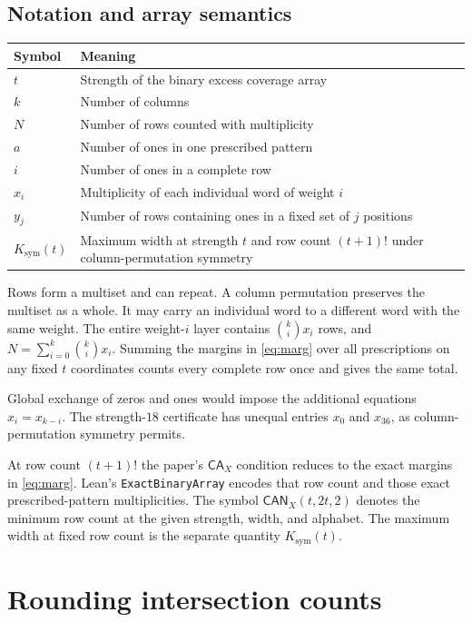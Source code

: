 \documentclass[11pt]{article}
\newcommand{\cx}{\mathsf{CA}_{X}}
\newcommand{\Ksym}{K_{\mathrm{sym}}}
\newcommand{\code}[1]{\texttt{#1}}
\begin{document}
\subsection{Notation and array semantics}
\begin{center}
\begin{tabular}{@{}lp{.79\linewidth}@{}}
\toprule
Symbol & Meaning \\
\midrule
\(t\) & Strength of the binary excess coverage array \\
\(k\) & Number of columns \\
\(N\) & Number of rows counted with multiplicity \\
\(a\) & Number of ones in one prescribed pattern \\
\(i\) & Number of ones in a complete row \\
\(x_i\) & Multiplicity of each individual word of weight \(i\) \\
\(y_j\) & Number of rows containing ones in a fixed set of \(j\) positions \\
\(\Ksym(t)\) & Maximum width at strength \(t\) and row count \((t+1)!\)
               under column-permutation symmetry \\
\bottomrule
\end{tabular}
\end{center}

Rows form a multiset and can repeat. A column permutation preserves
the multiset as a whole. It may carry an individual word to a
different word with the same weight. The entire weight-\(i\) layer
contains \(\binom{k}{i}x_i\) rows, and
\(N=\sum_{i=0}^{k}\binom{k}{i}x_i\). Summing the margins in
\eqref{eq:marg} over all prescriptions on any fixed \(t\)
coordinates counts every complete row once and gives the same total.

Global exchange of zeros and ones would impose the additional equations
\(x_i=x_{k-i}\). The strength-\(18\) certificate has unequal entries
\(x_0\) and \(x_{36}\), as column-permutation symmetry permits.

At row count \((t+1)!\) the paper's \(\cx\) condition reduces to
the exact margins in \eqref{eq:marg}. Lean's \code{ExactBinaryArray}
encodes that row count and those exact prescribed-pattern
multiplicities. The symbol \(\mathsf{CAN}_X(t,2t,2)\) denotes the
minimum row count at the given strength, width, and alphabet.
The maximum width at fixed row count is the separate quantity \(\Ksym(t)\).

\section{Rounding intersection counts}\label{sec:rounding}
\end{document}
